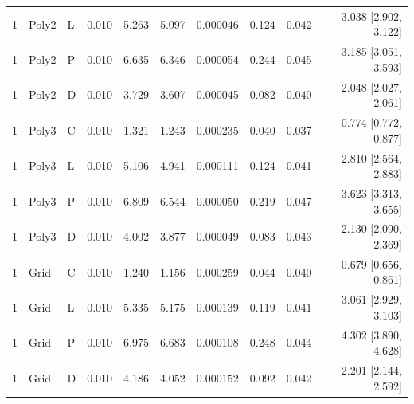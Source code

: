 \begin{longtable}{lllrrrrrrr}
1 & Poly2 & L & 0.010 & 5.263 & 5.097 & 0.000046 & 0.124 & 0.042 & 3.038 [2.902, 3.122] \\
1 & Poly2 & P & 0.010 & 6.635 & 6.346 & 0.000054 & 0.244 & 0.045 & 3.185 [3.051, 3.593] \\
1 & Poly2 & D & 0.010 & 3.729 & 3.607 & 0.000045 & 0.082 & 0.040 & 2.048 [2.027, 2.061] \\
1 & Poly3 & C & 0.010 & 1.321 & 1.243 & 0.000235 & 0.040 & 0.037 & 0.774 [0.772, 0.877] \\
1 & Poly3 & L & 0.010 & 5.106 & 4.941 & 0.000111 & 0.124 & 0.041 & 2.810 [2.564, 2.883] \\
1 & Poly3 & P & 0.010 & 6.809 & 6.544 & 0.000050 & 0.219 & 0.047 & 3.623 [3.313, 3.655] \\
1 & Poly3 & D & 0.010 & 4.002 & 3.877 & 0.000049 & 0.083 & 0.043 & 2.130 [2.090, 2.369] \\
1 & Grid & C & 0.010 & 1.240 & 1.156 & 0.000259 & 0.044 & 0.040 & 0.679 [0.656, 0.861] \\
1 & Grid & L & 0.010 & 5.335 & 5.175 & 0.000139 & 0.119 & 0.041 & 3.061 [2.929, 3.103] \\
1 & Grid & P & 0.010 & 6.975 & 6.683 & 0.000108 & 0.248 & 0.044 & 4.302 [3.890, 4.628] \\
1 & Grid & D & 0.010 & 4.186 & 4.052 & 0.000152 & 0.092 & 0.042 & 2.201 [2.144, 2.592] \\
\end{longtable}
\endgroup


